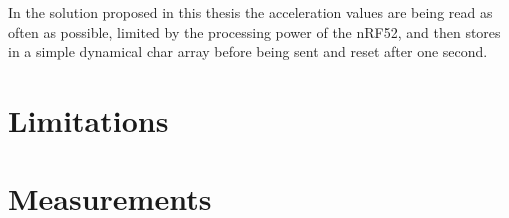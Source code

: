 In the solution proposed in this thesis the acceleration values are being read as often as possible, limited by the processing power of the nRF52, and then stores in a simple dynamical char array before being sent and reset after one second. 


\section{Limitations}




\section{Measurements}




